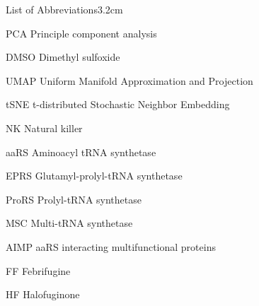 \begin{mclistof}{List of Abbreviations}{3.2cm}
\item[PCA] Principle component analysis

\item[DMSO] Dimethyl sulfoxide

\item[UMAP] Uniform Manifold Approximation and Projection

\item[tSNE] t-distributed Stochastic Neighbor Embedding

\item[NK] Natural killer

\item[aaRS] Aminoacyl tRNA synthetase

\item[EPRS] Glutamyl-prolyl-tRNA synthetase

\item[ProRS] Prolyl-tRNA synthetase

\item[MSC] Multi-tRNA synthetase

\item[AIMP] aaRS interacting multifunctional proteins

\item[FF] Febrifugine

\item[HF] Halofuginone
\end{mclistof} 
